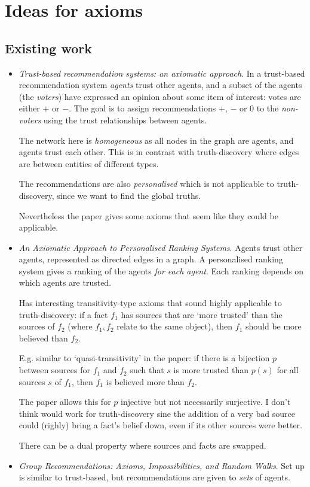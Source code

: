\documentclass{article}
\theoremstyle{definition}
\theoremstyle{plain}
\begin{document}
\section{Ideas for axioms}

\subsection{Existing work}

\begin{itemize}

\item \emph{Trust-based recommendation systems: an axiomatic
approach}{\cite{andersen}}. In a trust-based recommendation system
\emph{agents} trust other agents, and a subset of the agents (the
\emph{voters}) have expressed an opinion about some item of interest: votes are
either $+$ or $-$. The goal is to assign recommendations $+$, $-$ or $0$ to the
\emph{non-voters} using the trust relationships between agents.

The network here is \emph{homogeneous} as all nodes in the graph are agents,
and agents trust each other. This is in contrast with truth-discovery where
edges are between entities of different types.

The recommendations are also \emph{personalised} which is not applicable to
truth-discovery, since we want to find the global truths.

Nevertheless the paper gives some axioms that seem like they could be
applicable.

\item \emph{An Axiomatic Approach to Personalised Ranking
Systems}{\cite{altman_personalised}}. Agents trust other agents, represented as
directed edges in a graph. A personalised ranking system gives a ranking of the
agents \emph{for each agent}. Each ranking depends on which agents are trusted.

Has interesting transitivity-type axioms that sound highly applicable to
truth-discovery: if a fact $f_1$ has sources that are `more trusted' than the
sources of $f_2$ (where $f_1, f_2$ relate to the same object), then $f_1$
should be more believed than $f_2$.

E.g. similar to `quasi-transitivity' in the paper: if there is a bijection $p$
between sources for $f_1$ and $f_2$ such that $s$ is more trusted than $p(s)$
for all sources $s$ of $f_1$, then $f_1$ is believed more than $f_2$.

The paper allows this for $p$ injective but not necessarily surjective. I don't
think would work for truth-discovery sine the addition of a very bad source
could (righly) bring a fact's belief down, even if its other sources were
better.

There can be a dual property where sources and facts are swapped.

\item \emph{Group Recommendations: Axioms, Impossibilities, and Random
Walks}{\cite{lev}}. Set up is similar to trust-based, but recommendations are
given to \emph{sets} of agents.

\end{itemize}
\end{document}
